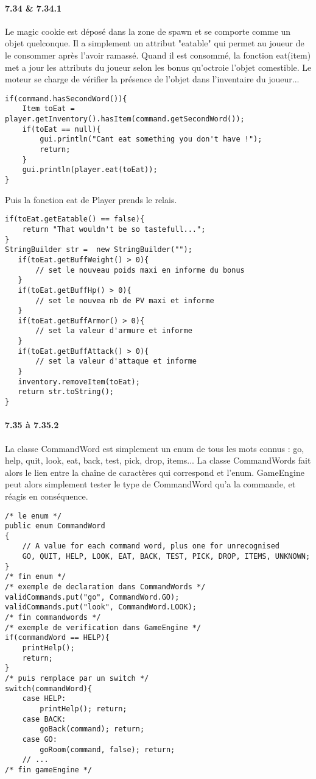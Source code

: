 \documentclass[11pt,a4paper]{report}
\begin{document}
\paragraph{7.34 \& 7.34.1}
Le magic cookie est déposé dans la zone de spawn et se comporte comme un objet quelconque. Il a simplement un attribut "eatable" qui permet au joueur de le consommer après l'avoir ramassé. Quand il est consommé, la fonction eat(item) met a jour les attributs du joueur selon les bonus qu'octroie l'objet comestible. Le moteur se charge de vérifier la présence de l'objet dans l'inventaire du joueur...
\begin{lstlisting}
if(command.hasSecondWord()){
    Item toEat = player.getInventory().hasItem(command.getSecondWord());
    if(toEat == null){
        gui.println("Cant eat something you don't have !");
        return;
    }
    gui.println(player.eat(toEat));
}
\end{lstlisting}
Puis la fonction eat de Player prends le relais.
\begin{lstlisting}
if(toEat.getEatable() == false){
    return "That wouldn't be so tastefull...";
}
StringBuilder str =  new StringBuilder("");
   if(toEat.getBuffWeight() > 0){
       // set le nouveau poids maxi en informe du bonus
   }
   if(toEat.getBuffHp() > 0){
       // set le nouvea nb de PV maxi et informe
   }
   if(toEat.getBuffArmor() > 0){
       // set la valeur d'armure et informe
   }
   if(toEat.getBuffAttack() > 0){
       // set la valeur d'attaque et informe
   }
   inventory.removeItem(toEat);
   return str.toString();
}
\end{lstlisting}

\paragraph{7.35 à 7.35.2}
La classe CommandWord est simplement un enum de tous les mots connus : go, help, quit, look, eat, back, test, pick, drop, items... La classe CommandWords fait alors le lien entre la chaîne de caractères qui correspond et l'enum. GameEngine peut alors simplement tester le type de CommandWord qu'a la commande, et réagis en conséquence.
\begin{lstlisting}
/* le enum */
public enum CommandWord
{
    // A value for each command word, plus one for unrecognised
    GO, QUIT, HELP, LOOK, EAT, BACK, TEST, PICK, DROP, ITEMS, UNKNOWN;
}
/* fin enum */
/* exemple de declaration dans CommandWords */
validCommands.put("go", CommandWord.GO);
validCommands.put("look", CommandWord.LOOK);
/* fin commandwords */
/* exemple de verification dans GameEngine */
if(commandWord == HELP){
    printHelp();
    return;
}
/* puis remplace par un switch */
switch(commandWord){
    case HELP:
        printHelp(); return;
    case BACK:
        goBack(command); return;
    case GO:
        goRoom(command, false); return;
    // ...
/* fin gameEngine */

\end{lstlisting}
\end{document}
